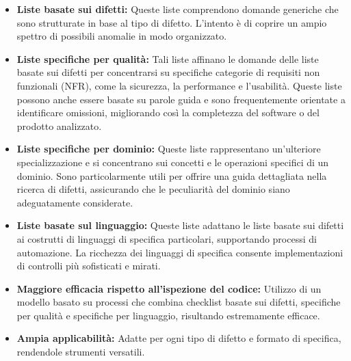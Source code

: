 \begin{itemize}
    \item \textbf{Liste basate sui difetti:} Queste liste comprendono domande 
    generiche che sono strutturate in base al tipo di difetto. L'intento è di 
    coprire un ampio spettro di possibili anomalie in modo organizzato.

    \item \textbf{Liste specifiche per qualità:} Tali liste affinano le domande 
    delle liste basate sui difetti per concentrarsi su specifiche categorie di 
    requisiti non funzionali (NFR), come la sicurezza, la performance e 
    l'usabilità. Queste liste possono anche essere basate su parole guida e 
    sono frequentemente orientate a identificare omissioni, migliorando così 
    la completezza del software o del prodotto analizzato.

    \item \textbf{Liste specifiche per dominio:} Queste liste rappresentano 
    un'ulteriore specializzazione e si concentrano sui concetti e le operazioni 
    specifici di un dominio. Sono particolarmente utili per offrire una guida 
    dettagliata nella ricerca di difetti, assicurando che le peculiarità del 
    dominio siano adeguatamente considerate.

    \item \textbf{Liste basate sul linguaggio:} Queste liste adattano le liste 
    basate sui difetti ai costrutti di linguaggi di specifica particolari, 
    supportando processi di automazione. La ricchezza dei linguaggi di specifica 
    consente implementazioni di controlli più sofisticati e mirati.
\end{itemize}
\begin{tcolorbox}[colback=green!5!white,colframe=green!75!black,title=Vantaggi 
    delle Checklist]
    \begin{itemize}
      \item \textbf{Maggiore efficacia rispetto all'ispezione del codice:} Utilizzo 
      di un modello basato su processi che combina checklist basate sui difetti, 
      specifiche per qualità e specifiche per linguaggio, risultando estremamente efficace.
      \item \textbf{Ampia applicabilità:} Adatte per ogni tipo di difetto e formato 
      di specifica, rendendole strumenti versatili.
    \end{itemize}
    \end{tcolorbox}
    
